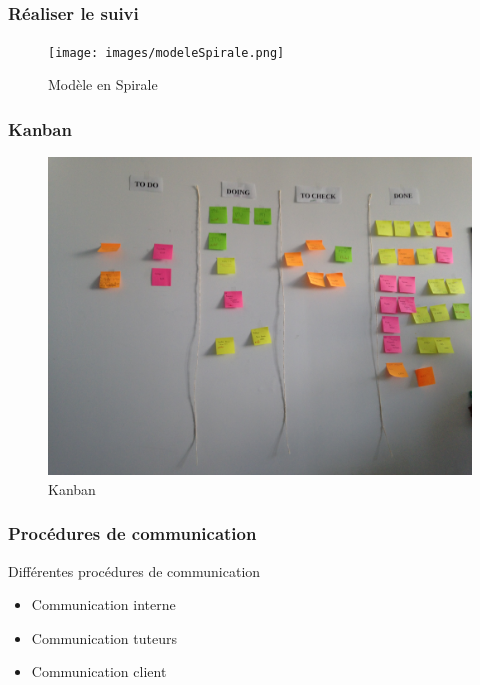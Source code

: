\subsection{}

\begin{frame}
\frametitle{Réaliser le suivi}
\begin{figure}
\begin{center}
\texttt{[image: images/modeleSpirale.png]}
\caption{Modèle en Spirale}
\label{MS}
\end{center}
\end{figure}
\end{frame}

\begin{frame}
\frametitle{Kanban}
\begin{figure}
\includegraphics[scale=0.075]{images/kanban.JPG}
\caption{Kanban}
\label{Kn}
\end{figure}
\end{frame}

\begin{frame}
\frametitle{Procédures de communication}
Différentes procédures de communication
\begin{itemize}
\item Communication interne
\item Communication tuteurs
\item Communication client
\end{itemize}
\end{frame}
